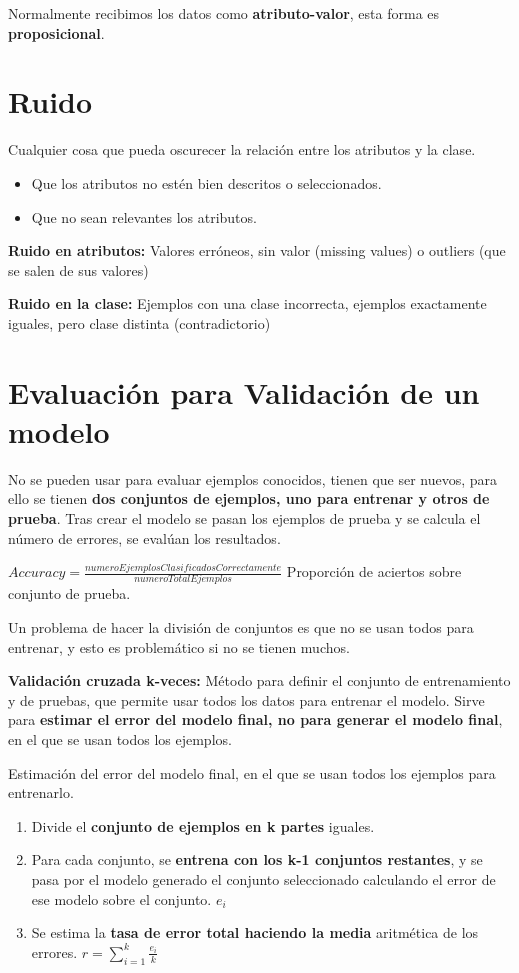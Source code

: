 \documentclass[12pt]{report} %
\begin{document}
Normalmente recibimos los datos como \textbf{atributo-valor}, esta forma
es \textbf{proposicional}.

\section{Ruido}

Cualquier cosa que pueda oscurecer la relación entre los atributos y la
clase.

\begin{itemize}

\item
  Que los atributos no estén bien descritos o seleccionados.
\item
  Que no sean relevantes los atributos.
\end{itemize}

\textbf{Ruido en atributos:} Valores erróneos, sin valor (missing
values) o outliers (que se salen de sus valores)

\textbf{Ruido en la clase:} Ejemplos con una clase incorrecta, ejemplos
exactamente iguales, pero clase distinta (contradictorio)

\section{Evaluación para Validación de un
modelo}

No se pueden usar para evaluar ejemplos conocidos, tienen que ser
nuevos, para ello se tienen \textbf{dos conjuntos de ejemplos, uno para
entrenar y otros de prueba}. Tras crear el modelo se pasan los ejemplos
de prueba y se calcula el número de errores, se evalúan los resultados.

\(Accuracy= \frac {numeroEjemplosClasificadosCorrectamente}{numeroTotalEjemplos}\)
Proporción de aciertos sobre conjunto de prueba.

Un problema de hacer la división de conjuntos es que no se usan todos
para entrenar, y esto es problemático si no se tienen muchos.

\textbf{Validación cruzada k-veces:} Método para definir el conjunto de
entrenamiento y de pruebas, que permite usar todos los datos para
entrenar el modelo. Sirve para \textbf{estimar el error del modelo
final, no para generar el modelo final}, en el que se usan todos los
ejemplos.

Estimación del error del modelo final, en el que se usan todos los
ejemplos para entrenarlo.

\begin{enumerate}
\def\labelenumi{\arabic{enumi}.}

\item
  Divide el \textbf{conjunto de ejemplos en k partes} iguales.
\item
  Para cada conjunto, se \textbf{entrena con los k-1 conjuntos
  restantes}, y se pasa por el modelo generado el conjunto seleccionado
  calculando el error de ese modelo sobre el conjunto. \(e_i\)
\item
  Se estima la \textbf{tasa de error total haciendo la media} aritmética
  de los errores. \(r= \sum_{i=1}^k \frac {e_i}{k}\)
\end{enumerate}
\end{document}
